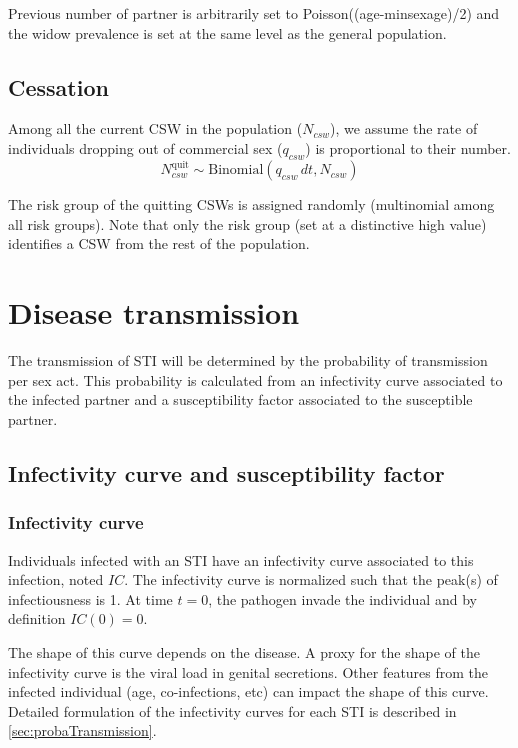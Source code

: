 \documentclass[11pt, onecolumn]{article}
\begin{document}
Previous number of partner is arbitrarily set to Poisson((age-minsexage)/2) and the widow prevalence is set at the same level as the general population.

\subsection{Cessation}

Among all the current CSW in the population ($N_{csw}$), we assume the rate of individuals dropping out of commercial sex ($q_{csw}$) is proportional to their number.
$$N_{csw}^{\mathrm{quit}} \sim \text{Binomial}\left(q_{csw}\,dt,N_{csw}\right)$$

The risk group of the quitting CSWs is assigned randomly (multinomial among all risk groups). Note that only the risk group (set at a distinctive high value) identifies a CSW from the rest of the population.




\section{Disease transmission}

The transmission of STI will be determined by the probability of transmission per sex act. This probability is calculated from an infectivity curve associated to the infected partner and a susceptibility factor associated to the susceptible partner.

\subsection{Infectivity curve and susceptibility factor}

\subsubsection*{Infectivity curve}
Individuals infected with an STI have an infectivity curve associated to this infection, noted $IC$. The infectivity curve is normalized such that the peak(s) of infectiousness is 1. At time $t=0$, the pathogen invade the individual and by definition $IC(0)=0$.

The shape of this curve depends on the disease. A proxy for the shape of the infectivity curve is the viral load in genital secretions. Other features from the infected individual (age, co-infections, etc) can impact the shape of this curve. Detailed formulation of the infectivity curves for each STI is described in \ref{sec:probaTransmission}.
\end{document}

